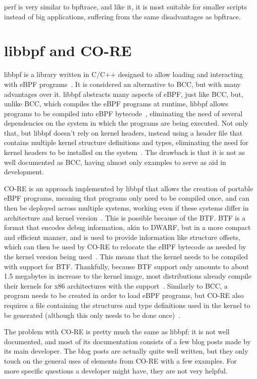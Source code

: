 perf is very similar to bpftrace, and like it, it is most suitable for smaller
scripts instead of big applications, suffering from the same disadvantages as
bpftrace.


\section{libbpf and CO-RE}

libbpf is a library written in C/C++ designed to allow loading and interacting
with eBPF programs~\cite{libbpf}. It is considered an alternative to \ac{BCC},
but with many advantages over it. libbpf abstracts many aspects of eBPF, just
like \ac{BCC}, but, unlike \ac{BCC}, which compiles the eBPF programs at
runtime, libbpf allows programs to be compiled into eBPF
bytecode~\cite{libbpf,contain}, eliminating the need of several dependencies on
the system in which the programs are being executed. Not only that, but libbpf
doesn't rely on kernel headers, instead using a header file that contains
multiple kernel structure definitions and types, eliminating the need for kernel
headers to be installed on the system~\cite{contain}. The drawback is that it is
not as well documented as \ac{BCC}, having almost only examples to serve as aid
in development.

\ac{CO-RE} is an approach implemented by libbpf that allows the creation of
portable eBPF programs, meaning that programs only need to be compiled once, and
can then be deployed across multiple systems, working even if these systems
differ in architecture and kernel version~\cite{coreref,fbslide}. This is
possible because of the \ac{BTF}. \ac{BTF} is a format that encodes debug
information, akin to \ac{DWARF}, but in a more compact and efficient manner, and
is used to provide information like structure offsets, which can then be used by
\ac{CO-RE} to relocate the eBPF bytecode as needed by the kernel version being
used~\cite{core}. This means that the kernel needs to be compiled with support
for \ac{BTF}. Thankfully, because \ac{BTF} support only amounts to about 1.5
megabytes in increase to the kernel image, most distributions already compile
their kernels for x86 architectures with the support~\cite{toolsfuture}.
Similarly to \ac{BCC}, a program needs to be created in order to load eBPF
programs, but \ac{CO-RE} also requires a file containing the structures and type
definitions used in the kernel to be generated (although this only needs to be
done once)~\cite{bootstrap}.

The problem with \ac{CO-RE} is pretty much the same as libbpf: it is not well
documented, and most of its documentation consists of a few blog posts made by
its main developer. The blog posts are actually quite well written, but they
only touch on the general uses of elements from \ac{CO-RE} with a few examples.
For more specific questions a developer might have, they are not very helpful.

